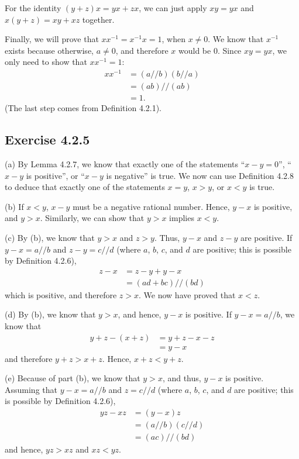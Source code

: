 \documentclass[12pt, oneside]{book}
\begin{document}
	For the identity $(y + z)x = yx + zx$, we can just apply $xy = yx$ and $x(y + z) = xy + xz$ together.

	Finally, we will prove that $xx^{-1} = x^{-1}x = 1$, when $x \ne 0$. We know that $x^{-1}$ exists because otherwise, $a \ne 0$, and therefore $x$ would be $0$. Since $xy = yx$, we only need to show that $xx^{-1} = 1$:
	\[\begin{split}
		xx^{-1} &= (a // b)(b // a) \\
		&= (ab) // (ab) \\
		&= 1.
	\end{split}\]
	(The last step comes from Definition 4.2.1).

	\subsection*{Exercise 4.2.5}

	\noindent (a) By Lemma 4.2.7, we know that exactly one of the statements ``$x - y = 0$'', ``$x - y$ is positive'', or ``$x - y$ is negative'' is true. We now can use Definition 4.2.8 to deduce that exactly one of the statements $x = y$, $x > y$, or $x < y$ is true.

	\bigskip
	\noindent (b) If $x < y$, $x - y$ must be a negative rational number. Hence, $y - x$ is positive, and $y > x$. Similarly, we can show that $y > x$ implies $x < y$.

	\bigskip
	\noindent (c) By (b), we know that $y > x$ and $z > y$. Thus, $y - x$ and $z - y$ are positive. If $y - x = a // b$ and $z - y = c // d$ (where $a$, $b$, $c$, and $d$ are positive; this is possible by Definition 4.2.6),
	\[\begin{split}
		z - x &= z - y + y - x \\
		&= (ad + bc) // (bd)
	\end{split}\]
	which is positive, and therefore $z > x$. We now have proved that $x < z$.

	\bigskip
	\noindent (d) By (b), we know that $y > x$, and hence, $y - x$ is positive. If $y - x = a // b$, we know that
	\[\begin{split}
		y + z - (x + z) &= y + z - x - z \\
		&= y - x
	\end{split}\]
	and therefore $y + z > x + z$. Hence, $x + z < y + z$.

	\bigskip
	\noindent (e) Because of part (b), we know that $y > x$, and thus, $y - x$ is positive. Assuming that $y - x = a // b$ and $z = c // d$ (where $a$, $b$, $c$, and $d$ are positive; this is possible by Definition 4.2.6),
	\[\begin{split}
		yz - xz &= (y - x)z \\
		&= (a // b)(c // d) \\
		&= (ac) // (bd)
	\end{split}\]
	and hence, $yz > xz$ and $xz < yz$.
\end{document}
